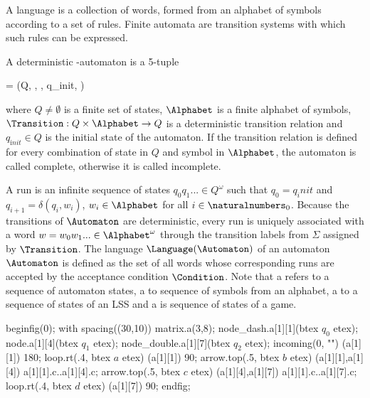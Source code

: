 A language is a collection of words, formed from an alphabet of symbols according to a set of rules.
Finite automata are transition systems with which such rules can be expressed.


\startsubsection[title={\omega-Automata},reference=sec:theory-automata-omega]

    A deterministic \omega-automaton is a 5-tuple 

    \startformula
        \Automaton = (Q, \Alphabet, \Transition, q_{\mathrm init}, \Condition) \EndComma
    \stopformula

    where
    $Q \neq \emptyset$ is a finite set of states,
    $\Alphabet$ is a finite alphabet of symbols,
    $\Transition: Q \times \Alphabet \rightarrow Q$ is a deterministic transition relation and
    $q_{\mathrm init} \in Q$ is the initial state of the automaton.
    If the transition relation is defined for every combination of state in $Q$ and symbol in $\Alphabet$, the automaton is called complete, otherwise it is called incomplete.

    A run is an infinite sequence of states $q_0 q_1 ... \in Q^\omega$ such that $q_0 = q_init$ and $q_{i+1} = \delta(q_i, w_i)$, $w_i \in \Alphabet$ for all $i \in \naturalnumbers_0$.
    Because the transitions of $\Automaton$ are deterministic, every run is uniquely associated with a word $w = w_0 w_1 ... \in \Alphabet^\omega$ through the transition labels from $\Sigma$ assigned by $\Transition$.
    The language $\Language(\Automaton)$ of an automaton $\Automaton$ is defined as the set of all words whose corresponding runs are accepted by the acceptance condition $\Condition$.
    Note that a  refers to a sequence of automaton states, a  to sequence of symbols from an alphabet, a  to a sequence of states of an LSS and a  is sequence of states of a game.

\stopsubsection


    beginfig(0);
        with spacing((30,10)) matrix.a(3,8);
        node_dash.a[1][1](btex $q_0$ etex);
        node.a[1][4](btex $q_1$ etex);
        node_double.a[1][7](btex $q_2$ etex);
        incoming(0, "") (a[1][1]) 180;
        loop.rt(.4, btex \;$a$ etex) (a[1][1]) 90;
        arrow.top(.5, btex $b$ etex) (a[1][1],a[1][4]) a[1][1].c..a[1][4].c;
        arrow.top(.5, btex $c$ etex) (a[1][4],a[1][7]) a[1][1].c..a[1][7].c;
        loop.rt(.4, btex \;$d$ etex) (a[1][7]) 90;
    endfig;
\stopreusableMPgraphic

